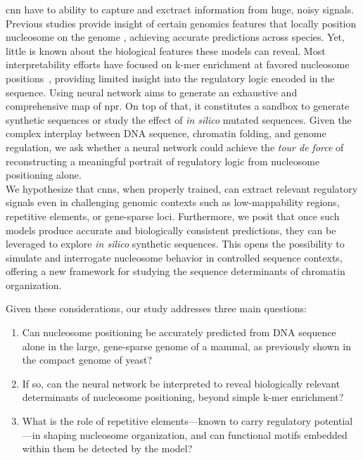 \documentclass[11pt]{book}
\begin{document}
\gls{cnn} have to ability to capture and exctract information from huge, noisy signals. Previous studies provide insight of certain genomics features that locally position nucleosome on the genome \cite{di_gangi_deep_2018,amato_corenup_2020,zhou_deepnup_2022,han_nucleosome_2022}, achieving accurate predictions across species. Yet, little is known about the biological features these models can reveal. Most interpretability efforts have focused on k-mer enrichment at favored nucleosome positions~\cite{masoudi-sobhanzadeh_interpretable_2024,mondo_consecutive_2025}, providing limited insight into the regulatory logic encoded in the sequence. Using neural network aims to generate an exhaustive and comprehensive map of \gls{npr}. On top of that, it constitutes a sandbox to generate synthetic sequences or study the effect of \textit{in silico} mutated sequences.
Given the complex interplay between DNA sequence, chromatin folding, and genome regulation, we ask whether a neural network could achieve the \textit{tour de force} of reconstructing a meaningful portrait of regulatory logic from nucleosome positioning alone. \\
We hypothesize that \glspl{cnn}, when properly trained, can extract relevant regulatory signals even in challenging genomic contexts such as low-mappability regions, repetitive elements, or gene-sparse loci. Furthermore, we posit that once such models produce accurate and biologically consistent predictions, they can be leveraged to explore \textit{in silico} synthetic sequences. This opens the possibility to simulate and interrogate nucleosome behavior in controlled sequence contexts, offering a new framework for studying the sequence determinants of chromatin organization.

Given these considerations, our study addresses three main questions:  
\begin{enumerate}
    \item Can nucleosome positioning be accurately predicted from DNA sequence alone in the large, gene-sparse genome of a mammal, as previously shown in the compact genome of yeast?
    \item If so, can the neural network be interpreted to reveal biologically relevant determinants of nucleosome positioning, beyond simple k-mer enrichment?
    \item What is the role of repetitive elements—known to carry regulatory potential—in shaping nucleosome organization, and can functional motifs embedded within them be detected by the model?
\end{enumerate}
\end{document}
